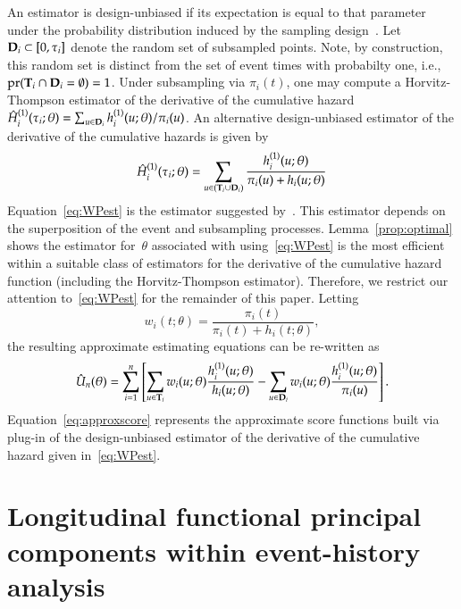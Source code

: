 \documentclass[12pt]{amsart}
\def\pr{\mathop{\text{pr}}\nolimits}
\def\pr{\mathop{\text{pr}}\nolimits}
\def\bfT{{\bf T}}
\def\bfD{{\bf D}}
\begin{document}
An estimator is design-unbiased if its expectation is equal to that parameter under the probability distribution induced by the sampling design~\citep{Cassel1977}. Let~$\bfD_i \subset [0,\tau_i]$ denote the random set of subsampled points.  Note, by construction, this random set is distinct from the set of event times with probabilty one, i.e.,~$\pr( \bfT_i \cap \bfD_i = \emptyset) = 1$.  Under subsampling via $\pi_i (t)$, one may compute a Horvitz-Thompson estimator of the derivative of the cumulative hazard $\hat H_{i}^{(1)} (\tau_i; \theta) = \sum_{u \in \bfD_i} h^{(1)}_i (u; \theta)/\pi_i (u)$. An alternative design-unbiased estimator of the derivative of the cumulative hazards is given by
\begin{equation}
\label{eq:WPest}
\hat H_{i}^{(1)} (\tau_i; \theta) = \sum_{u \in (\bfT_i \cup \bfD_i)}
\frac{ h^{(1)}_i ( u; \theta ) }{ \pi_i (u) + h_i ( u ; \theta) }
\end{equation}
Equation~\eqref{eq:WPest} is the estimator suggested by~\cite{Waagepetersen2008}.  This estimator depends on the superposition of the event and subsampling processes. Lemma~\ref{prop:optimal} shows the estimator for~$\theta$ associated with using~\eqref{eq:WPest} is the most efficient within a suitable class of estimators for the derivative of the cumulative hazard function (including the Horvitz-Thompson estimator). Therefore, we restrict our attention to~\eqref{eq:WPest} for the remainder of this paper. Letting
\begin{equation}
\label{eq:waage_weights}
w_i (t; \theta) = \frac{\pi_i (t)}{\pi_i (t) + h_i (t ; \theta)},
\end{equation}
the resulting approximate estimating equations can be re-written as
\begin{equation}
\label{eq:approxscore}
\hat{U}_n (\theta) = \sum_{i=1}^n \left[ \sum_{u \in \bfT_i} w_i(u; \theta)
  \frac{h^{(1)}_i (u; \theta)}{ h_i ( u; \theta)}  - \sum_{u \in \bfD_i} w_i(u;
  \theta) \frac{h_i^{(1)} (u; \theta)}{ \pi_i (u) } \right].
\end{equation}
Equation~\eqref{eq:approxscore} represents the approximate score functions built via plug-in of the design-unbiased estimator of the derivative of the cumulative hazard given in~\eqref{eq:WPest}.

\section{Longitudinal functional principal components within
  event-history analysis}
  \label{section:longfpc}
\end{document}
